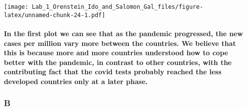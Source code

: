 \documentclass[
]{article}
\begin{document}
\texttt{[image: Lab\_1\_Orenstein\_Ido\_and\_Salomon\_Gal\_files/figure-latex/unnamed-chunk-24-1.pdf]}

\hypertarget{in-the-first-plot-we-can-see-that-as-the-pandemic-progressed-the-new-cases-per-million-vary-more-between-the-countries.-we-believe-that-this-is-because-more-and-more-countries-understood-how-to-cope-better-with-the-pandemic-in-contrast-to-other-countries-with-the-contributing-fact-that-the-covid-tests-probably-reached-the-less-developed-countries-only-at-a-later-phase.}{%
\paragraph{In the first plot we can see that as the pandemic progressed,
the new cases per million vary more between the countries. We believe
that this is because more and more countries understood how to cope
better with the pandemic, in contrast to other countries, with the
contributing fact that the covid tests probably reached the less
developed countries only at a later
phase.}\label{in-the-first-plot-we-can-see-that-as-the-pandemic-progressed-the-new-cases-per-million-vary-more-between-the-countries.-we-believe-that-this-is-because-more-and-more-countries-understood-how-to-cope-better-with-the-pandemic-in-contrast-to-other-countries-with-the-contributing-fact-that-the-covid-tests-probably-reached-the-less-developed-countries-only-at-a-later-phase.}}

\hypertarget{b-4}{%
\subsubsection{B}\label{b-4}}
\end{document}
